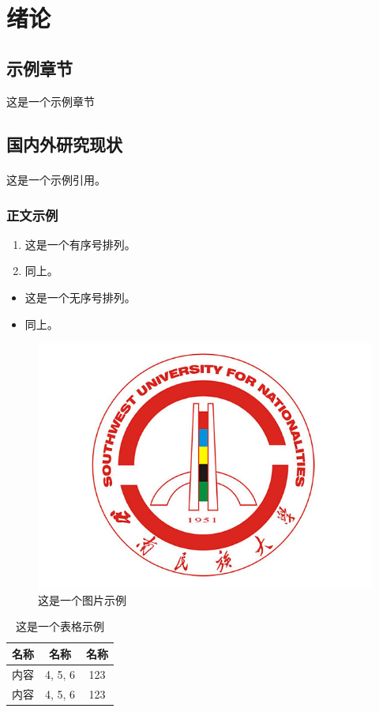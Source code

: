 \chapter{绪论}
\section{示例章节}
这是一个示例章节
\section{国内外研究现状}
这是一个示例引用。\textsuperscript{\cite{dongshihai2004}}

\subsection{正文示例}

\begin{enumerate}
	\item 这是一个有序号排列。
	\item 同上。
\end{enumerate}

\begin{itemize}
	\item 这是一个无序号排列。
	\item 同上。
	
\end{itemize}


\begin{figure}[htbp!]
	\centering
	\includegraphics[scale=0.5]{figures/logo.jpg}
	\caption{这是一个图片示例}\label{fig1}
\end{figure}

\begin{table}[H]
	\centering
	\caption{这是一个表格示例}
	\begin{tabular}{ccc}
			\toprule
			名称 & 名称 & 名称 \\ \midrule
			内容 & 4, 5, 6 & 123 \\
			内容 & 4, 5, 6 & 123 \\ \bottomrule
	\end{tabular}
\end{table}